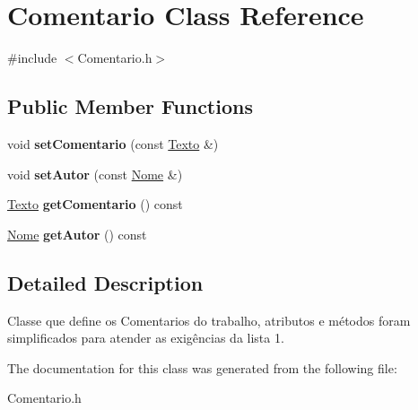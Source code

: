 \hypertarget{classComentario}{}\section{Comentario Class Reference}
\label{classComentario}


{\ttfamily \#include $<$Comentario.\+h$>$}

\subsection*{Public Member Functions}
\begin{DoxyCompactItemize}
\item 
void {\bfseries set\+Comentario} (const \hyperlink{classTexto}{Texto} \&)\hypertarget{classComentario_accce67c86eb2a26e270f717f02b167f4}{}\label{classComentario_accce67c86eb2a26e270f717f02b167f4}

\item 
void {\bfseries set\+Autor} (const \hyperlink{classNome}{Nome} \&)\hypertarget{classComentario_a88210cfb710e81928f9e5d516fdeed28}{}\label{classComentario_a88210cfb710e81928f9e5d516fdeed28}

\item 
\hyperlink{classTexto}{Texto} {\bfseries get\+Comentario} () const \hypertarget{classComentario_ab07091bbad7e54161edb83bc11c9fb13}{}\label{classComentario_ab07091bbad7e54161edb83bc11c9fb13}

\item 
\hyperlink{classNome}{Nome} {\bfseries get\+Autor} () const \hypertarget{classComentario_a7467ead8c7ed5045635f5606d49d4b02}{}\label{classComentario_a7467ead8c7ed5045635f5606d49d4b02}

\end{DoxyCompactItemize}


\subsection{Detailed Description}
Classe que define os Comentarios do trabalho, atributos e métodos foram simplificados para atender as exigências da lista 1. 

The documentation for this class was generated from the following file\+:\begin{DoxyCompactItemize}
\item 
Comentario.\+h\end{DoxyCompactItemize}
